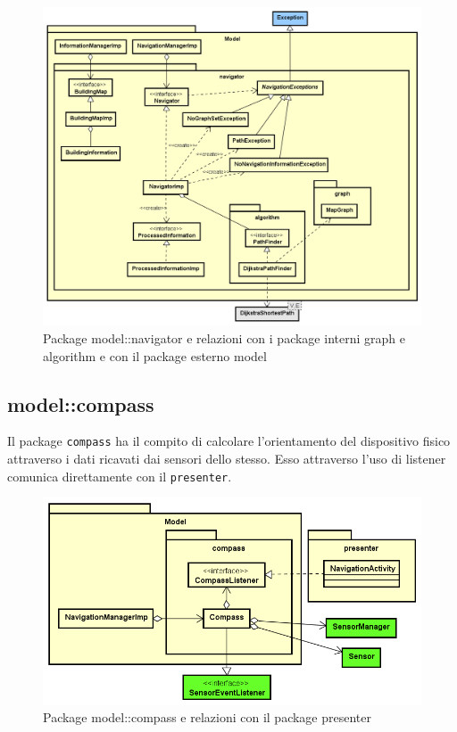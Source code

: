\documentclass[../DefinizioneDiProdotto.tex,lanscape]{subfiles}
\begin{document}
\begin{figure}[h]
	\includegraphics[width=\textwidth]{img/RelationPackage/navigator}
	\caption{Package model::navigator e relazioni con i package interni graph e algorithm e con il package esterno model}
	\label{navigatorPackage}
\end{figure}


\newpage

	\subsection{model::compass}
		Il package \verb|compass| ha il compito di calcolare l'orientamento del dispositivo fisico attraverso i dati ricavati dai sensori dello stesso. Esso attraverso l'uso di listener comunica direttamente con il \verb|presenter|.

\begin{figure}[h]
	\centering
	\includegraphics[scale=0.6]{img/RelationPackage/compass}
	\caption{Package model::compass e relazioni con il package presenter}
	\label{compassPackage}
\end{figure}
\end{document}
